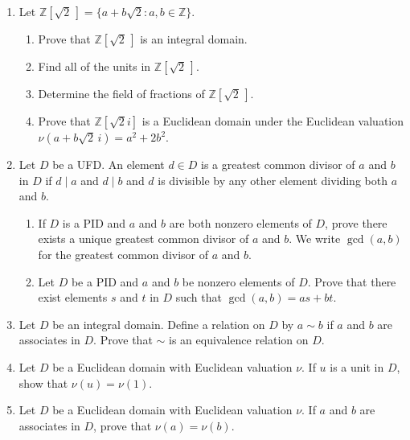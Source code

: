 {\begin{enumerate}
 
 
 
\item
Let ${\mathbb Z}[ \sqrt{2}\, ] = \{ a + b \sqrt{2} : a, b \in {\mathbb Z} \}$. 
\begin{enumerate}

 \item
Prove that ${\mathbb Z}[ \sqrt{2}\, ]$ is an integral domain. 

 \item
Find all of the units in ${\mathbb Z}[\sqrt{2}\, ]$. 

 \item
Determine the field of fractions of ${\mathbb Z}[ \sqrt{2}\, ]$. 
 
 \item
Prove that  ${\mathbb Z}[ \sqrt{2} i ]$ is a Euclidean domain under the
Euclidean valuation $\nu( a + b \sqrt{2}\, i) = a^2 + 2b^2$. 
 
\end{enumerate}


\item
Let $D$ be a UFD. An element $d \in D$ is a {\bfi greatest common
divisor of} $a$
{\bfi and} $b$ {\bfi in} $D$ if $d \mid a$ and $d \mid b$ and $d$ is
divisible by any other element dividing both $a$ and $b$.  
\begin{enumerate}

 \item
If $D$ is a PID and $a$ and $b$ are both nonzero elements of $D$,
prove there exists a unique greatest common divisor of $a$ and $b$. We 
write $\gcd( a, b)$ for the greatest common divisor of $a$ and $b$. 

 \item
Let $D$ be a PID and $a$ and $b$ be nonzero elements of $D$. Prove
that there exist elements $s$ and $t$ in $D$ such that $\gcd(a, b) =
as + bt$.

\end{enumerate}


\item
Let $D$ be an integral domain. Define a relation on $D$ by $a \sim b$
if $a$ and $b$ are associates in $D$.  Prove that $\sim$ is an
equivalence relation on $D$.  


\item
Let $D$ be a Euclidean domain with Euclidean valuation $\nu$.  If $u$
is a unit in $D$, show that $\nu(u) = \nu(1)$.


\item
Let $D$ be a Euclidean domain with Euclidean valuation $\nu$.  If $a$
and $b$ are associates in $D$, prove that $\nu(a) = \nu(b)$.



\end{enumerate}}
